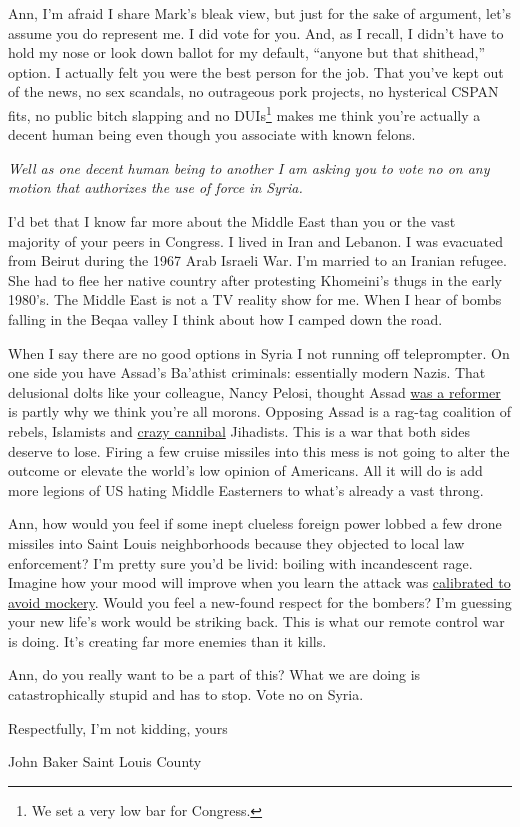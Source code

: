 Ann, I'm afraid I share Mark's bleak view, but just for the sake of
argument, let's assume you do represent me. I did vote for you. And, as
I recall, I didn't have to hold my nose or look down ballot for my
default, ``anyone but that shithead,'' option. I actually felt you were
the best person for the job. That you've kept out of the news, no sex
scandals, no outrageous pork projects, no hysterical CSPAN fits, no
public bitch slapping and no DUIs\footnote{
We set a very low bar for Congress.
} makes me think you're actually a decent human being even though you
associate with known felons.

\medskip

\emph{Well as one decent human being to another I am asking you to vote
no on any motion that authorizes the use of force in Syria.}

\medskip

I'd bet that I know far more about the Middle East than you or the vast
majority of your peers in Congress. I lived in Iran and Lebanon. I was
evacuated from Beirut during the 1967 Arab Israeli War. I'm married to
an Iranian refugee. She had to flee her native country after protesting
Khomeini's thugs in the early 1980's. The Middle East is not a TV
reality show for me. When I hear of bombs falling in the Beqaa valley I
think about how I camped down the road.

When I say there are no good options in Syria I not running off
teleprompter. On one side you have Assad's Ba'athist criminals:
essentially modern Nazis. That delusional dolts like your colleague,
Nancy Pelosi, thought Assad
\href{http://www.nationalreview.com/articles/312450/assads-useful-idiots-noah-glyn}{was
a reformer} is partly why we think you're all morons. Opposing Assad is
a rag-tag coalition of rebels, Islamists and
\href{http://www.bbc.co.uk/news/magazine-23190533}{crazy cannibal}
Jihadists. This is a war that both sides deserve to lose. Firing a few
cruise missiles into this mess is not going to alter the outcome or
elevate the world's low opinion of Americans. All it will do is add more
legions of US hating Middle Easterners to what's already a vast throng.

Ann, how would you feel if some inept clueless foreign power lobbed a
few drone missiles into Saint Louis neighborhoods because they objected
to local law enforcement? I'm pretty sure you'd be livid: boiling with
incandescent rage. Imagine how your mood will improve when you learn the
attack was
\href{http://www.thedailybeast.com/articles/2013/08/31/is-obama-going-to-war-just-to-check-the-box.html}{calibrated
to avoid mockery}. Would you feel a new-found respect for the bombers?
I'm guessing your new life's work would be striking back. This is what
our remote control war is doing. It's creating far more enemies than it
kills.

Ann, do you really want to be a part of this? What we are doing is
catastrophically stupid and has to stop. Vote no on Syria.

\medskip

\noindent Respectfully, I'm not kidding, yours

\noindent John Baker Saint Louis County

%
